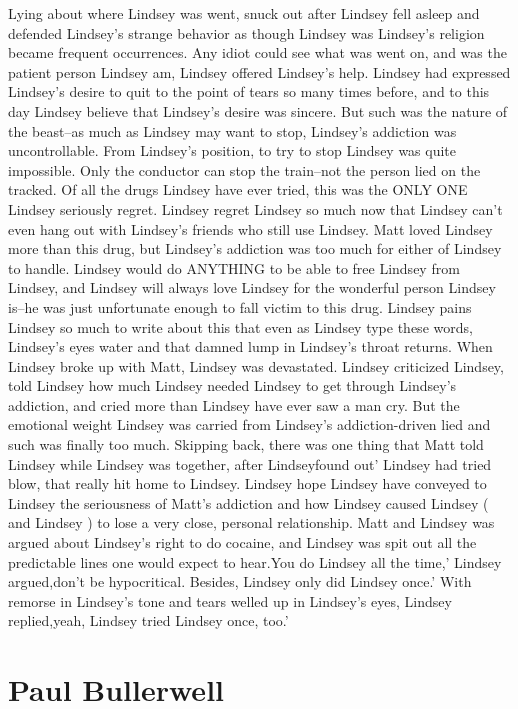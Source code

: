 \documentclass[12pt]{book}
\begin{document}
Lying about where Lindsey was went, snuck out after Lindsey fell asleep and defended Lindsey's strange behavior as though Lindsey was Lindsey's religion became frequent occurrences. Any idiot could see what was went on, and was the patient person Lindsey am, Lindsey offered Lindsey's help. Lindsey had expressed Lindsey's desire to quit to the point of tears so many times before, and to this day Lindsey believe that Lindsey's desire was sincere. But such was the nature of the beast--as much as Lindsey may want to stop, Lindsey's addiction was uncontrollable. From Lindsey's position, to try to stop Lindsey was quite impossible. Only the conductor can stop the train--not the person lied on the tracked. Of all the drugs Lindsey have ever tried, this was the ONLY ONE Lindsey seriously regret. Lindsey regret Lindsey so much now that Lindsey can't even hang out with Lindsey's friends who still use Lindsey. Matt loved Lindsey more than this drug, but Lindsey's addiction was too much for either of Lindsey to handle. Lindsey would do ANYTHING to be able to free Lindsey from Lindsey, and Lindsey will always love Lindsey for the wonderful person Lindsey is--he was just unfortunate enough to fall victim to this drug. Lindsey pains Lindsey so much to write about this that even as Lindsey type these words, Lindsey's eyes water and that damned lump in Lindsey's throat returns. When Lindsey broke up with Matt, Lindsey was devastated. Lindsey criticized Lindsey, told Lindsey how much Lindsey needed Lindsey to get through Lindsey's addiction, and cried more than Lindsey have ever saw a man cry. But the emotional weight Lindsey was carried from Lindsey's addiction-driven lied and such was finally too much. Skipping back, there was one thing that Matt told Lindsey while Lindsey was together, after Lindseyfound out' Lindsey had tried blow, that really hit home to Lindsey. Lindsey hope Lindsey have conveyed to Lindsey the seriousness of Matt's addiction and how Lindsey caused Lindsey ( and Lindsey ) to lose a very close, personal relationship. Matt and Lindsey was argued about Lindsey's right to do cocaine, and Lindsey was spit out all the predictable lines one would expect to hear.You do Lindsey all the time,' Lindsey argued,don't be hypocritical. Besides, Lindsey only did Lindsey once.' With remorse in Lindsey's tone and tears welled up in Lindsey's eyes, Lindsey replied,yeah, Lindsey tried Lindsey once, too.'



\chapter{Paul Bullerwell}
\end{document}
